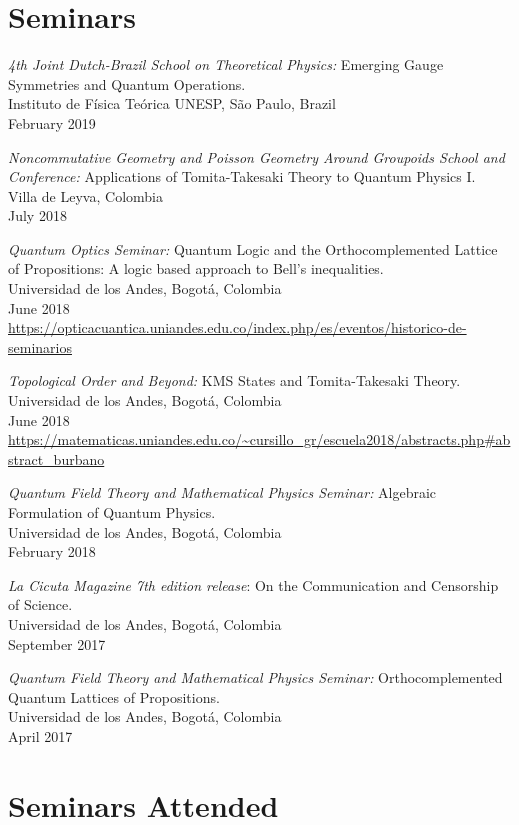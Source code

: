 \documentclass[line,margin]{res}
\begin{document}
\begin{resume}
\section{Seminars}

{\sl 4th Joint Dutch-Brazil School on Theoretical Physics:} Emerging Gauge Symmetries and Quantum Operations.\\
Instituto de Física Teórica UNESP, São Paulo, Brazil\\
February 2019

{\sl Noncommutative Geometry and Poisson Geometry Around Groupoids School and Conference:} Applications of Tomita-Takesaki Theory to Quantum Physics I.\\
Villa de Leyva, Colombia\\
July 2018

{\sl Quantum Optics Seminar:} Quantum Logic and the Orthocomplemented Lattice of Propositions: A logic based approach to Bell's inequalities.\\
Universidad de los Andes, Bogotá, Colombia\\
June 2018\\
\url{https://opticacuantica.uniandes.edu.co/index.php/es/eventos/historico-de-seminarios}

{\sl Topological Order and Beyond:} KMS States and Tomita-Takesaki Theory.\\
Universidad de los Andes, Bogotá, Colombia\\
June 2018\\
\url{https://matematicas.uniandes.edu.co/~cursillo_gr/escuela2018/abstracts.php#abstract_burbano}

{\sl Quantum Field Theory and Mathematical Physics Seminar:} Algebraic Formulation of Quantum Physics.\\
Universidad de los Andes, Bogotá, Colombia\\
February 2018

{\sl La Cicuta Magazine 7th edition release}: On the Communication and Censorship of Science.\\
Universidad de los Andes, Bogotá, Colombia\\
September 2017

{\sl Quantum Field Theory and Mathematical Physics Seminar:} Orthocomplemented Quantum Lattices of Propositions.\\
Universidad de los Andes, Bogotá, Colombia\\
April 2017
  
  
\section{Seminars Attended}


\end{resume}
\end{document}
